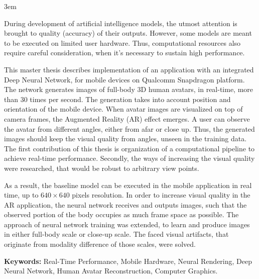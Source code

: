 \emergencystretch 3em

\par
During development of artificial intelligence models, the utmost attention is brought to quality (accuracy) of their outputs. However, some models are meant to be executed on limited user hardware. Thus, computational resources also require careful consideration, when it's necessary to sustain high performance.

\par
This master thesis describes implementation of an application with an integrated Deep Neural Network, for mobile devices on Qualcomm Snapdragon platform. The network generates images of full-body 3D human avatars, in real-time, more than 30 times per second. The generation takes into account position and orientation of the mobile device. When avatar images are visualized on top of camera frames, the Augmented Reality (AR) effect emerges. A user can observe the avatar from different angles, either from afar or close up. Thus, the generated images should keep the visual quality from angles, unseen in the training data. The first contribution of this thesis is organization of a computational pipeline to achieve real-time performance. Secondly, the ways of increasing the visual quality were researched, that would be robust to arbitrary view points.

\par
As a result, the baseline model \cite{dnn:stylepeople21} can be executed in the mobile application in real time, up to $640\times640$ pixels resolution. In order to increase visual quality in the AR application, the neural network receives and outputs images, such that the observed portion of the body occupies as much frame space as possible. The approach of neural network training was extended, to learn and produce images in either full-body scale or close-up scale. The faced visual artifacts, that originate from modality difference of those scales, were solved. 

\par
\textbf{Keywords:} Real-Time Performance, Mobile Hardware, Neural Rendering, Deep Neural Network, Human Avatar Reconstruction, Computer Graphics.  
